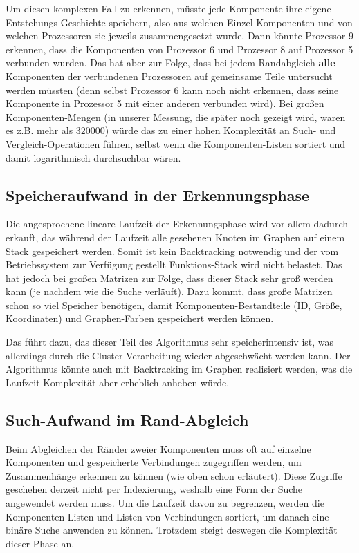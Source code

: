 Um diesen komplexen Fall zu erkennen, müsste jede Komponente ihre eigene Entstehungs-Geschichte speichern, also aus welchen Einzel-Komponenten und von welchen Prozessoren sie jeweils zusammengesetzt wurde. Dann könnte Prozessor 9 erkennen, dass die Komponenten von Prozessor 6 und Prozessor 8 auf Prozessor 5 verbunden wurden. Das hat aber zur Folge, dass bei jedem Randabgleich \textbf{alle} Komponenten der verbundenen Prozessoren auf gemeinsame Teile untersucht werden müssten (denn selbst Prozessor 6 kann noch nicht erkennen, dass seine Komponente in Prozessor 5 mit einer anderen verbunden wird). Bei großen Komponenten-Mengen (in unserer Messung, die später noch gezeigt wird, waren es z.B. mehr als $320000$) würde das zu einer hohen Komplexität an Such- und Vergleich-Operationen führen, selbst wenn die Komponenten-Listen sortiert und damit logarithmisch durchsuchbar wären.

\subsection{Speicheraufwand in der Erkennungsphase}

Die angesprochene lineare Laufzeit der Erkennungsphase wird vor allem dadurch erkauft, das während der Laufzeit alle gesehenen Knoten im Graphen auf einem Stack gespeichert werden. Somit ist kein Backtracking notwendig und der vom Betriebssystem zur Verfügung gestellt Funktions-Stack wird nicht belastet. Das hat jedoch bei großen Matrizen zur Folge, dass dieser Stack sehr groß werden kann (je nachdem wie die Suche verläuft). Dazu kommt, dass große Matrizen schon so viel Speicher benötigen, damit Komponenten-Bestandteile (ID, Größe, Koordinaten) und Graphen-Farben gespeichert werden können.

Das führt dazu, das dieser Teil des Algorithmus sehr speicherintensiv ist, was allerdings durch die Cluster-Verarbeitung wieder abgeschwächt werden kann. Der Algorithmus könnte auch mit Backtracking im Graphen realisiert werden, was die Laufzeit-Komplexität aber erheblich anheben würde.

\subsection{Such-Aufwand im Rand-Abgleich}

Beim Abgleichen der Ränder zweier Komponenten muss oft auf einzelne Komponenten und gespeicherte Verbindungen zugegriffen werden, um Zusammenhänge erkennen zu können (wie oben schon erläutert). Diese Zugriffe geschehen derzeit nicht per Indexierung, weshalb eine Form der Suche angewendet werden muss. Um die Laufzeit davon zu begrenzen, werden die Komponenten-Listen und Listen von Verbindungen sortiert, um danach eine binäre Suche anwenden zu können. Trotzdem steigt deswegen die Komplexität dieser Phase an.

